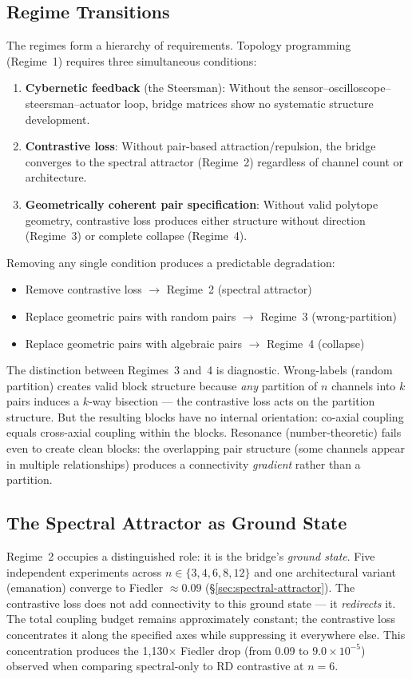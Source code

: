 \subsection{Regime Transitions}

The regimes form a hierarchy of requirements. Topology programming
(Regime~1) requires three simultaneous conditions:

\begin{enumerate}
  \item \textbf{Cybernetic feedback} (the Steersman): Without the
    sensor--oscilloscope--steersman--actuator loop, bridge matrices show no
    systematic structure development.
  \item \textbf{Contrastive loss}: Without pair-based attraction/repulsion,
    the bridge converges to the spectral attractor (Regime~2) regardless of
    channel count or architecture.
  \item \textbf{Geometrically coherent pair specification}: Without valid
    polytope geometry, contrastive loss produces either structure without
    direction (Regime~3) or complete collapse (Regime~4).
\end{enumerate}

Removing any single condition produces a predictable degradation:
\begin{itemize}
  \item Remove contrastive loss $\rightarrow$ Regime~2 (spectral attractor)
  \item Replace geometric pairs with random pairs $\rightarrow$ Regime~3
    (wrong-partition)
  \item Replace geometric pairs with algebraic pairs $\rightarrow$ Regime~4
    (collapse)
\end{itemize}

The distinction between Regimes~3 and~4 is diagnostic. Wrong-labels (random
partition) creates valid block structure because \emph{any} partition of $n$
channels into $k$ pairs induces a $k$-way bisection --- the contrastive loss
acts on the partition structure. But the resulting blocks have no internal
orientation: co-axial coupling equals cross-axial coupling within the blocks.
Resonance (number-theoretic) fails even to create clean blocks: the overlapping
pair structure (some channels appear in multiple relationships) produces a
connectivity \emph{gradient} rather than a partition.

\subsection{The Spectral Attractor as Ground State}

Regime~2 occupies a distinguished role: it is the bridge's \emph{ground
state}. Five independent experiments across $n \in \{3, 4, 6, 8, 12\}$ and
one architectural variant (emanation) converge to Fiedler $\approx 0.09$
(\S\ref{sec:spectral-attractor}). The contrastive loss does not add
connectivity to this ground state --- it \emph{redirects} it. The total
coupling budget remains approximately constant; the contrastive loss
concentrates it along the specified axes while suppressing it everywhere
else. This concentration produces the 1{,}130$\times$ Fiedler drop (from
0.09 to $9.0 \times 10^{-5}$) observed when comparing spectral-only to RD
contrastive at $n{=}6$.
